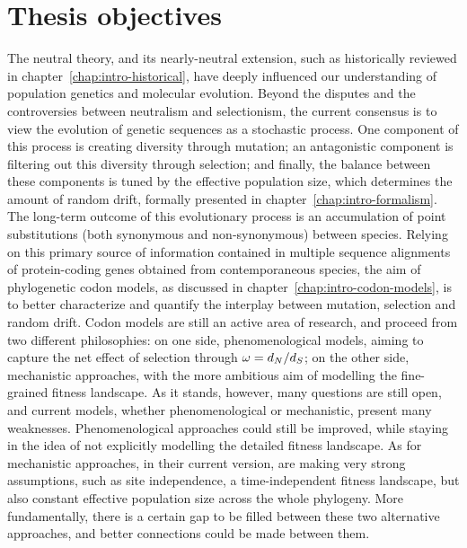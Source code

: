 \chapter{Thesis objectives}
{\hypersetup{linkcolor=GREYDARK}\minitoc}
\label{chap:goals}

The neutral theory, and its nearly-neutral extension, such as historically reviewed in chapter~\ref{chap:intro-historical}, have deeply influenced our understanding of population genetics and molecular evolution.
Beyond the disputes and the controversies between neutralism and selectionism, the current consensus is to view the evolution of genetic sequences as a stochastic process.
One component of this process is creating diversity through mutation; an antagonistic component is filtering out this diversity through selection; and finally, the balance between these components is tuned by the effective population size, which determines the amount of random drift, formally presented in chapter~\ref{chap:intro-formalism}.
The long-term outcome of this evolutionary process is an accumulation of point substitutions (both synonymous and non-synonymous) between species.
Relying on this primary source of information contained in multiple sequence alignments of protein-coding genes obtained from contemporaneous species, the aim of phylogenetic codon models, as discussed in chapter~\ref{chap:intro-codon-models}, is to better characterize and quantify the interplay between mutation, selection and random drift.
Codon models are still an active area of research, and proceed from two different philosophies: on one side, phenomenological models, aiming to capture the net effect of selection through $\omega = d_N / d_S$; on the other side, mechanistic approaches, with the more ambitious aim of modelling the fine-grained fitness landscape.
As it stands, however, many questions are still open, and current models, whether phenomenological or mechanistic, present many weaknesses.
Phenomenological approaches could still be improved, while staying in the idea of not explicitly modelling the detailed fitness landscape.
As for mechanistic approaches, in their current version, are making very strong assumptions, such as site independence, a time-independent fitness landscape, but also constant effective population size across the whole phylogeny.
More fundamentally, there is a certain gap to be filled between these two alternative approaches, and better connections could be made between them.

